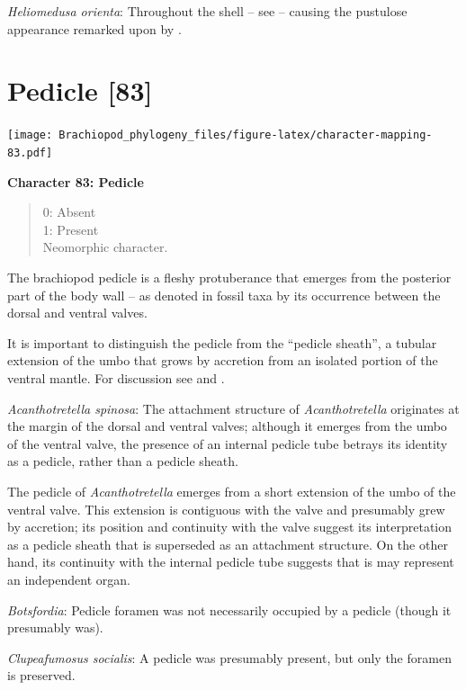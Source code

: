 \documentclass[openany]{book}
\theoremstyle{definition}
\theoremstyle{definition}
\theoremstyle{definition}
\theoremstyle{remark}
\begin{document}
\hypertarget{Heliomedusa_orienta-coding-82}{}
\emph{Heliomedusa orienta}: Throughout the shell -- see
\citet{Williams2007Supplement} -- causing the pustulose appearance
remarked upon by \citet{Chen2007Reinterpretationof}.

\section{Pedicle {[}83{]}}\label{pedicle-83}

\texttt{[image: Brachiopod\_phylogeny\_files/figure-latex/character-mapping-83.pdf]}

\textbf{Character 83: Pedicle}

\begin{quote}
0: Absent\\
1: Present\\
Neomorphic character.
\end{quote}

The brachiopod pedicle is a fleshy protuberance that emerges from the
posterior part of the body wall -- as denoted in fossil taxa by its
occurrence between the dorsal and ventral valves.

It is important to distinguish the pedicle from the ``pedicle sheath'',
a tubular extension of the umbo that grows by accretion from an isolated
portion of the ventral mantle. For discussion see
\citet{Holmer2018Theattachment} and \citet{Bassett2017Earliestontogeny}.

\hypertarget{Acanthotretella_spinosa-coding-83}{}
\emph{Acanthotretella spinosa}: The attachment structure of
\emph{Acanthotretella} originates at the margin of the dorsal and
ventral valves; although it emerges from the umbo of the ventral valve,
the presence of an internal pedicle tube betrays its identity as a
pedicle, rather than a pedicle sheath.

The pedicle of \emph{Acanthotretella} emerges from a short extension of
the umbo of the ventral valve. This extension is contiguous with the
valve and presumably grew by accretion; its position and continuity with
the valve suggest its interpretation as a pedicle sheath that is
superseded as an attachment structure. On the other hand, its continuity
with the internal pedicle tube suggests that is may represent an
independent organ.

\hypertarget{Botsfordia-coding-83}{}
\emph{Botsfordia}: Pedicle foramen was not necessarily occupied by a
pedicle (though it presumably was).

\hypertarget{Clupeafumosus_socialis-coding-83}{}
\emph{Clupeafumosus socialis}: A pedicle was presumably present, but
only the foramen is preserved.
\end{document}
